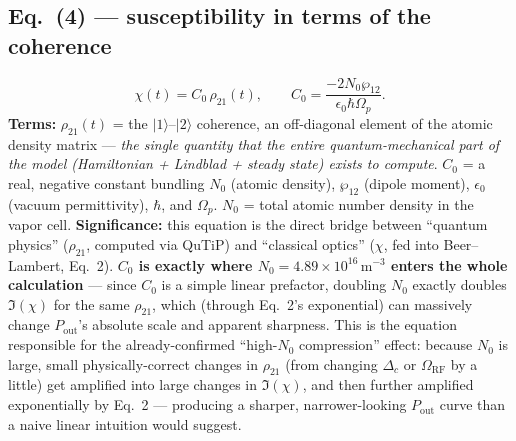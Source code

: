 \documentclass[11pt]{article}
\begin{document}
\subsection*{Eq.~(4) --- susceptibility in terms of the coherence}
\begin{equation}
\chi(t) = C_0\,\rho_{21}(t), \qquad C_0 = \frac{-2N_0\wp_{12}}{\epsilon_0\hbar\Omega_p}. \tag{4}
\end{equation}
\textbf{Terms:} $\rho_{21}(t)$ = the $|1\rangle$--$|2\rangle$ coherence,
an off-diagonal element of the atomic density matrix --- \emph{the
single quantity that the entire quantum-mechanical part of the model
(Hamiltonian + Lindblad + steady state) exists to compute}. $C_0$ = a
real, negative constant bundling $N_0$ (atomic density), $\wp_{12}$
(dipole moment), $\epsilon_0$ (vacuum permittivity), $\hbar$, and
$\Omega_p$. $N_0$ = total atomic number density in the vapor cell.
\textbf{Significance:} this equation is the direct bridge between
``quantum physics'' ($\rho_{21}$, computed via QuTiP) and ``classical
optics'' ($\chi$, fed into Beer--Lambert, Eq.~2). \textbf{$C_0$ is
exactly where $N_0=4.89\times10^{16}\,\text{m}^{-3}$ enters the whole
calculation} --- since $C_0$ is a simple linear prefactor, doubling
$N_0$ exactly doubles $\Im(\chi)$ for the same $\rho_{21}$, which (through
Eq.~2's exponential) can massively change $P_\text{out}$'s absolute
scale and apparent sharpness. This is the equation responsible for the
already-confirmed ``high-$N_0$ compression'' effect: because $N_0$ is
large, small physically-correct changes in $\rho_{21}$ (from changing
$\Delta_c$ or $\Omega_\text{RF}$ by a little) get amplified into large
changes in $\Im(\chi)$, and then further amplified exponentially by
Eq.~2 --- producing a sharper, narrower-looking $P_\text{out}$ curve than
a naive linear intuition would suggest.
\end{document}
